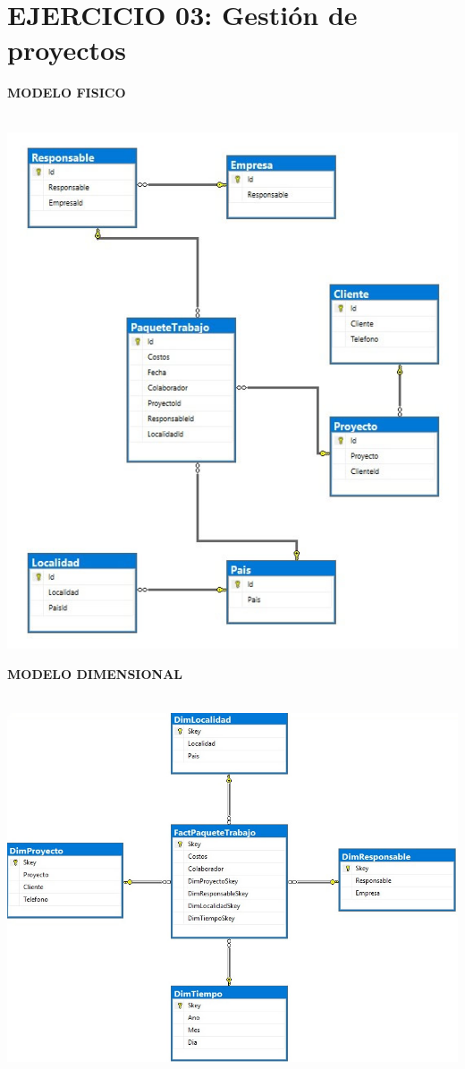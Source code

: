 \section{EJERCICIO 03: Gestión de proyectos }

\textbf{MODELO FISICO}\\\\
\begin{center}
\includegraphics[width=\columnwidth]{images/task3/e3}\newline
\end{center}

\textbf{MODELO DIMENSIONAL}\\\\
\begin{center}
\includegraphics[width=\columnwidth]{images/task3/d3}\newline
\end{center}